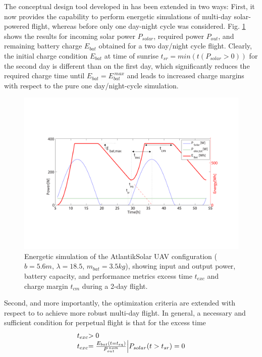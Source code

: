 \label{sec:ExtensionOptCriteria}
The conceptual design tool developed in \cite{Noth_PhD,Leutenegger_JIRS} has been extended in two ways: First, it now provides the capability to perform energetic simulations of multi-day solar-powered flight, whereas before only one day-night cycle was considered. Fig. \ref{fig:EnergySimulation} shows the results for incoming solar power $P_{solar}$, required power $P_{out}$, and remaining battery charge $E_{bat}$ obtained for a two day/night cycle flight. Clearly, the initial charge condition $E_{bat}$ at time of sunrise $t_{sr}=min(t(P_{solar}>0))$ for the second day is different than on the first day, which significantly reduces the required charge time until $E_{bat}=E_{bat}^{\,max}$ and leads to increased charge margins with respect to the pure one day/night-cycle simulation. %
\begin{figure}[tb]
    \centering
    \includegraphics[width=\linewidth]{images/2_EnergySimulation}
    \caption{Energetic simulation of the AtlantikSolar UAV configuration ($b=5.6m$, $\lambda=18.5$, $m_{bat}=3.5kg$), showing input and output power, battery capacity, and performance metrics excess time $t_{exc}$ and charge margin $t_{cm}$ during a 2-day flight.}
    \label{fig:EnergySimulation}
\end{figure}
Second, and more importantly, the optimization criteria are extended with respect to \cite{Noth_PhD,Leutenegger_JIRS} to achieve more robust multi-day flight. In general, a necessary and sufficient condition for perpetual flight is that for the excess time
\begin{equation} \label{eqn:t_exc}
\begin{array}{r@{}l}
t_{exc}&>0\\
t_{exc}&=\frac{E_{bat}(t=t_{eq})}{P_{out}^{\,nom}} \Big| P_{solar}(t>t_{sr})=0
\end{array}
\end{equation}
